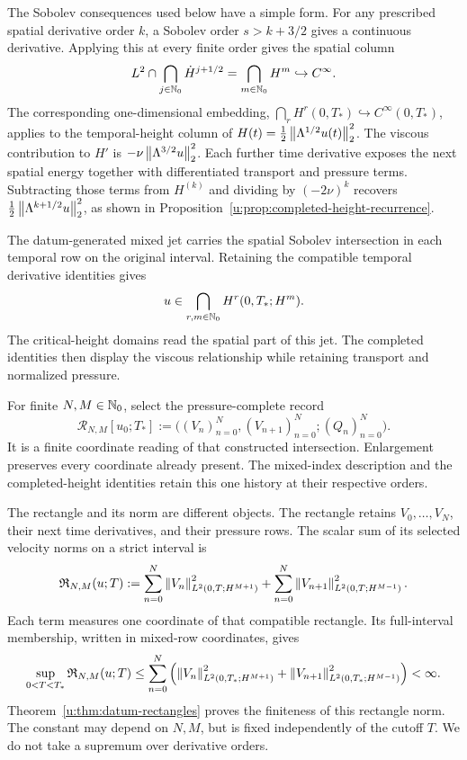 The Sobolev consequences used below have a simple form. For any prescribed
spatial derivative order \(k\), a Sobolev order
\(s>k+3/2\) gives a continuous derivative.  Applying this at every finite
order gives the spatial column
\[
 L^2\cap\bigcap_{j\in\mathbb N_0}\dot H^{j+1/2}
 =\bigcap_{m\in\mathbb N_0}H^m\hookrightarrow C^\infty.
\]
The corresponding one-dimensional embedding,
\(\bigcap_r H^r(0,T_*)\hookrightarrow C^\infty(0,T_*)\), applies to
the temporal-height column of
\(H(t)=\tfrac12\left\lVert \Lambda^{1/2}u(t)\right\rVert_2^2\).
The viscous contribution to \(H'\) is
\(-\nu\left\lVert \Lambda^{3/2}u\right\rVert_2^2\).  Each further time derivative exposes
the next spatial energy together with differentiated transport and pressure
terms.  Subtracting those terms from \(H^{(k)}\) and dividing by
\((-2\nu)^k\) recovers \(\tfrac12\left\lVert \Lambda^{k+1/2}u\right\rVert_2^2\), as shown
in Proposition~\ref{u:prop:completed-height-recurrence}.

The datum-generated mixed jet carries the spatial Sobolev intersection in
each temporal row on the original interval. Retaining the compatible
temporal derivative identities gives
\begin{equation}
 u\in\bigcap_{r,m\in\mathbb N_0}H^r(0,T_*;H^m).
 \label{u:eq:intro-all-orders-intersection}
\end{equation}
The critical-height domains read the spatial part of this jet. The completed
identities then display the viscous relationship while retaining transport
and normalized pressure.

For finite \(N,M\in\mathbb N_0\), select the pressure-complete record
\[
 \mathcal R_{N,M}[u_0;T_*]
 :=\bigl((V_n)_{n=0}^{N},(V_{n+1})_{n=0}^{N};(Q_n)_{n=0}^{N}\bigr).
\]
It is a finite coordinate reading of that constructed intersection.
Enlargement preserves every coordinate already present. The mixed-index
description and the completed-height identities retain this one history
at their respective orders.

The rectangle and its norm are different objects.  The rectangle retains
\(V_0,\ldots,V_N\), their next time derivatives, and their pressure rows.
The scalar sum of its selected velocity norms on a strict interval is
\begin{equation}
 \mathfrak R_{N,M}(u;T)
 :=\sum_{n=0}^{N}\left\lVert V_n\right\rVert_{L^2(0,T;H^{M+1})}^2
 +\sum_{n=0}^{N}\left\lVert V_{n+1}\right\rVert_{L^2(0,T;H^{M-1})}^2.
 \label{u:eq:intro-rectangle-norm}
\end{equation}
Each term measures one coordinate of that compatible rectangle.  Its
full-interval membership, written in mixed-row coordinates, gives
\begin{equation}
 \sup_{0<T<T_*}\mathfrak R_{N,M}(u;T)
 \le\sum_{n=0}^N\left(
 \left\lVert V_n\right\rVert_{L^2(0,T_*;H^{M+1})}^2
 +\left\lVert V_{n+1}\right\rVert_{L^2(0,T_*;H^{M-1})}^2\right)<\infty.
 \label{u:eq:intro-terminal-rectangle}
\end{equation}
Theorem~\ref{u:thm:datum-rectangles} proves the finiteness of this rectangle norm.
The constant may depend on \(N,M\), but is fixed independently of the
cutoff \(T\).  We do not take a supremum over derivative orders.

